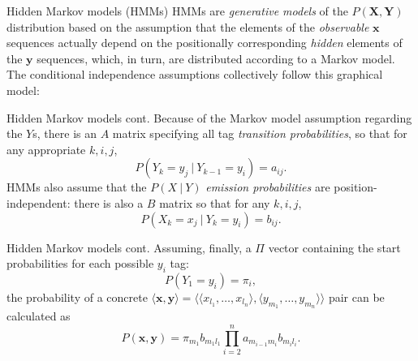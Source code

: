 \documentclass[style=upen, size=14pt]{powerdot}
\newcommand{\gold}{\color{arany}}
\theoremstyle{definition}
\begin{document}
  \begin{slide}[toc=HMMs]{Hidden Markov models (HMMs)}
    HMMs are \emph{generative models} of the $P(\mathbf{X}, \mathbf{Y})$
    distribution based on the assumption that the elements of the \emph{\gold
      observable} $\mathbf{x}$ sequences actually depend on the positionally
    corresponding \emph{\gold hidden} elements of the $\mathbf{y}$ sequences,
    which, in turn, are distributed according to a Markov model. The conditional
    independence assumptions collectively follow this graphical model:
    \begin{center}
    \end{center}
  \end{slide}

  \begin{slide}[toc=]{Hidden Markov models cont.}
    Because of the Markov model assumption regarding the $Y$s, there is an
    $A$ matrix specifying all tag \emph{\gold transition probabilities}, so
    that for any appropriate $k, i, j$,
    $$
    P(Y_k=y_j ~|~Y_{k-1}=y_i) = a_{i j}.
    $$
    HMMs also assume that the $P(X~|~Y)$ \emph{\gold emission probabilities} are
    position-independent: there is also a $B$ matrix so that for any
    $k, i, j$,
    $$
    P(X_k= x_j ~|~Y_{k}= y_i) = b_{i j}.
    $$
  \end{slide}

  \begin{slide}[toc=]{Hidden Markov models cont.}
    Assuming, finally, a $\Pi$ vector containing the start probabilities
    for each possible $y_i$ tag:
    $$
    P(Y_1 = y_i) = \pi_i,
    $$
    the probability of a concrete
    $\langle \mathbf{x}, \mathbf{y} \rangle =\langle \langle
    x_{l_1},\dots,x_{l_n} \rangle, \langle y_{m_1},\dots,y_{m_n} \rangle
    \rangle$ pair can be calculated as
    $$
    P(\mathbf{x}, \mathbf{y}) = \pi_{m_1} b_{m_1 l_1}
    \prod_{i=2}^na_{m_{i-1} m_i}b_{m_i l_i}.
    $$
  \end{slide}
\end{document}
